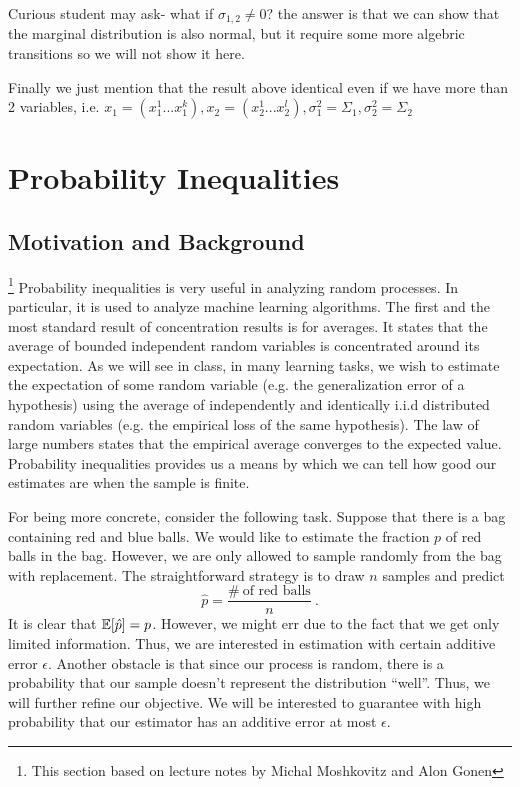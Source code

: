 \documentclass[11pt]{article}
\begin{document}
Curious student may ask- what if $\sigma_{1,2}\neq 0$? the answer is that we can show that the marginal distribution is also normal, but it require some more algebric transitions so we will not show it here. 

Finally we just mention that the result above identical even if we have more than 2 variables, i.e. $x_1=(x_1^1...x_1^k), x_2=(x_2^1...x_2^l), \sigma_1^2=\Sigma_1, \sigma_2^2=\Sigma_2$


\section{Probability Inequalities}
\subsection{Motivation and Background}
\footnote{This section based on lecture notes by Michal Moshkovitz and Alon Gonen} Probability inequalities is very useful in analyzing random processes. In particular, it is used to analyze machine learning algorithms. The first and the most standard result of concentration results is for
averages. It states that the average of bounded independent random variables is concentrated around its expectation. As we will see in class, in many
learning tasks, we wish to estimate the expectation of some random variable
(e.g. the generalization error of a hypothesis) using the average of independently and identically i.i.d distributed random variables (e.g. the empirical loss of the same hypothesis). The law of large numbers states that the empirical average converges to the expected value. Probability inequalities provides us a means by which we can tell how good our estimates are when the sample is finite.

For being more concrete, consider the following task. Suppose that
there is a bag containing red and blue balls. We would like to
estimate the fraction $p$ of red balls in the bag. However, we are only
allowed to sample randomly from the bag with replacement. The
straightforward strategy is to draw $n$ samples and predict
\[
\hat{p} = \frac{\# ~\text{of red balls}}{n}~.
\]
It is clear that $\mathbb{E} [\hat{p}] = p$. However, we might err due to the
fact that we get only limited information. Thus, we are
interested in estimation with certain additive error
$\epsilon$. Another obstacle is that since our process is random,
there is a probability that our sample doesn't represent the
distribution ``well''. Thus, we will further refine our objective. We will
be interested to guarantee with high probability that our estimator
has an additive error at most $\epsilon$. 
\end{document}
